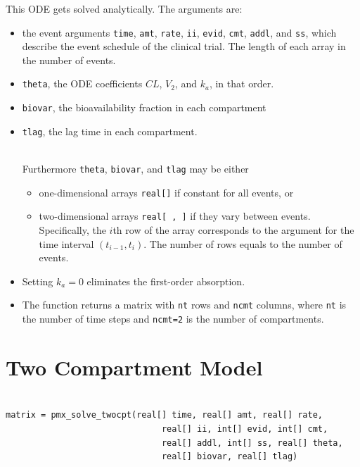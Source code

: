 \documentclass[11pt, reqno, oneside]{amsbook}
\numberwithin{equation}{chapter}
\numberwithin{figure}{chapter}
\numberwithin{table}{chapter}
\theoremstyle{remark}
\begin{document}
This ODE gets solved analytically. The arguments are:
%
\begin{itemize}
\item the event arguments \texttt{time}, \texttt{amt}, \texttt{rate}, \texttt{ii}, \texttt{evid}, \texttt{cmt}, \texttt{addl},
and \texttt{ss}, which describe the event schedule of the clinical
trial. The length of each array in the number of events.
\item \texttt{theta}, the ODE coefficients \(CL\), \(V_2\), and \(k_a\), in that order.
\item \texttt{biovar}, the bioavailability fraction in each compartment
\item \texttt{tlag}, the lag time in each compartment.

\ \\
\noindent
Furthermore \texttt{theta}, \texttt{biovar}, and \texttt{tlag} may be either 
\begin{itemize}
\item one-dimensional arrays \texttt{real[]}
if constant for all events, or
\item two-dimensional arrays \texttt{real[ , ]} if they vary between events. Specifically, the \(i\)th row of the array corresponds to 
the argument for the time interval \((t_{i-1}, t_i)\).
The number of rows equals to the number of events.
\end{itemize}
\item Setting \(k_a = 0\) eliminates the first-order absorption.
\item The function returns a matrix with \texttt{nt} rows
and \texttt{ncmt} columns, where \texttt{nt} is the number of time steps and
\texttt{ncmt=2} is the number of compartments.
\end{itemize}

\section{Two Compartment Model}
\label{sec:orgf071725}
\label{org969eb5c}
\begin{verbatim}

matrix = pmx_solve_twocpt(real[] time, real[] amt, real[] rate,
                               real[] ii, int[] evid, int[] cmt,
                               real[] addl, int[] ss, real[] theta,
                               real[] biovar, real[] tlag)
\end{verbatim}
\end{document}
